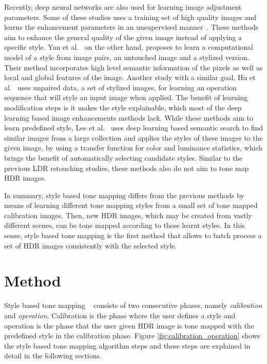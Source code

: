 Recently, deep neural networks are also used for learning image adjustment parameters. Some of these studies uses a training set of high quality images and learns the enhancement parameters in an unsupervised manner~\cite{park2018distort, chen2018deep,ignatov2018wespe}. These methods aim to enhance the general quality of the given image instead of applying a specific style. Yan et al.~\cite{yan2016automatic} on the other hand, proposes to learn a computational model of a style from image pairs, an untouched image and a stylized version. Their method incorporates high level semantic information of the pixels as well as local and global features of the image. Another study with a similar goal, Hu et al.~\cite{hu2018exposure} uses unpaired data, a set of stylized images, for learning an operation sequence that will style an input image when applied. The benefit of learning modification steps is it makes the style explainable, which most of the deep learning based image enhancements methods lack. While these methods aim to learn predefined style, Lee et al.~\cite{lee2016automatic} uses deep learning based semantic search to find similar images from a large collection and applies the styles of these images to the given image, by using a transfer function for color and luminance statistics, which brings the benefit of automatically selecting candidate styles. Similar to the previous LDR retouching studies, these methods also do not aim to tone map HDR images.

In summary, style based tone mapping differs from the previous methods by means of learning different tone mapping styles from a small set of tone mapped calibration images. Then, new HDR images, which may be created from vastly different scenes, can be tone mapped according to these learnt styles. In this sense, style based tone mapping is the first method that allows to batch process a set of HDR images consistently with the selected style.


\section{Method}
Style based tone mapping ~\cite{akyuz2013style} consists of two consecutive phases, namely \emph{calibration} and \emph{operation}. Calibration is the phase where the user defines a style and operation is the phase that the user given HDR image is tone mapped with the predefined style in the calibration phase. Figure \ref{fig:calibration_operation} shows the style based tone mapping algorithm steps and these steps are explained in detail in the following sections.

